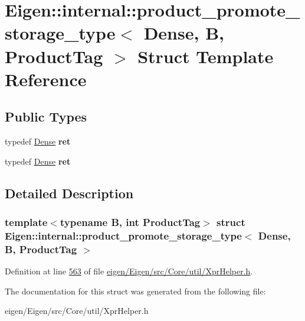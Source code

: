 \hypertarget{struct_eigen_1_1internal_1_1product__promote__storage__type_3_01_dense_00_01_b_00_01_product_tag_01_4}{}\section{Eigen\+:\+:internal\+:\+:product\+\_\+promote\+\_\+storage\+\_\+type$<$ Dense, B, Product\+Tag $>$ Struct Template Reference}
\label{struct_eigen_1_1internal_1_1product__promote__storage__type_3_01_dense_00_01_b_00_01_product_tag_01_4}
\subsection*{Public Types}
\begin{DoxyCompactItemize}
\item 
\mbox{\label{struct_eigen_1_1internal_1_1product__promote__storage__type_3_01_dense_00_01_b_00_01_product_tag_01_4_ac3a1efea82c04a784a4a91c24f4a24be}} 
typedef \hyperlink{struct_eigen_1_1_dense}{Dense} {\bfseries ret}
\item 
\mbox{\label{struct_eigen_1_1internal_1_1product__promote__storage__type_3_01_dense_00_01_b_00_01_product_tag_01_4_ac3a1efea82c04a784a4a91c24f4a24be}} 
typedef \hyperlink{struct_eigen_1_1_dense}{Dense} {\bfseries ret}
\end{DoxyCompactItemize}


\subsection{Detailed Description}
\subsubsection*{template$<$typename B, int Product\+Tag$>$\newline
struct Eigen\+::internal\+::product\+\_\+promote\+\_\+storage\+\_\+type$<$ Dense, B, Product\+Tag $>$}



Definition at line \hyperlink{eigen_2_eigen_2src_2_core_2util_2_xpr_helper_8h_source_l00563}{563} of file \hyperlink{eigen_2_eigen_2src_2_core_2util_2_xpr_helper_8h_source}{eigen/\+Eigen/src/\+Core/util/\+Xpr\+Helper.\+h}.



The documentation for this struct was generated from the following file\+:\begin{DoxyCompactItemize}
\item 
eigen/\+Eigen/src/\+Core/util/\+Xpr\+Helper.\+h\end{DoxyCompactItemize}
